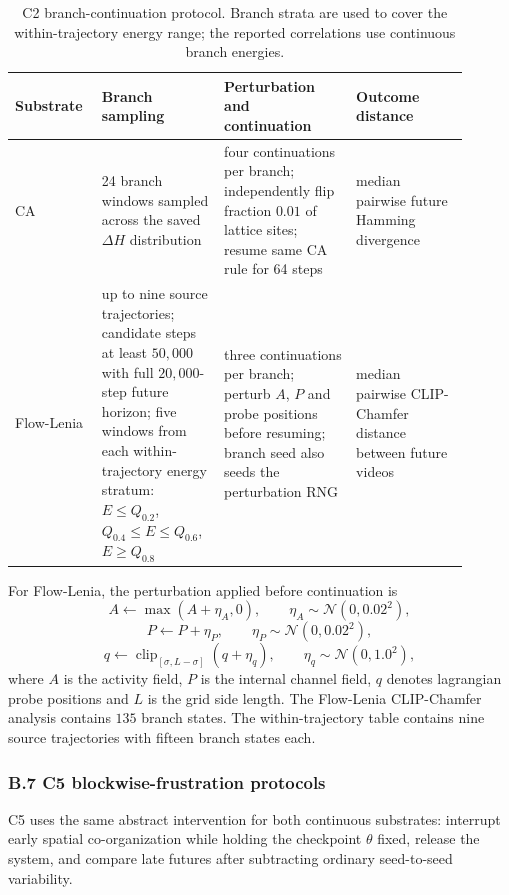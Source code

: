\begin{table}[H]
\centering
\scriptsize
\begin{tabular}{p{0.15\linewidth}p{0.25\linewidth}p{0.27\linewidth}p{0.23\linewidth}}
\toprule
Substrate & Branch sampling & Perturbation and continuation & Outcome distance \\
\midrule
CA & 24 branch windows sampled across the saved $\Delta H$ distribution & four continuations per branch; independently flip fraction $0.01$ of lattice sites; resume same CA rule for 64 steps & median pairwise future Hamming divergence \\
Flow-Lenia & up to nine source trajectories; candidate steps at least $50{,}000$ with full $20{,}000$-step future horizon; five windows from each within-trajectory energy stratum: $E\le Q_{0.2}$, $Q_{0.4}\le E\le Q_{0.6}$, $E\ge Q_{0.8}$ & three continuations per branch; perturb $A$, $P$ and probe positions before resuming; branch seed also seeds the perturbation RNG & median pairwise CLIP-Chamfer distance between future videos \\
\bottomrule
\end{tabular}
\caption{C2 branch-continuation protocol.  Branch strata are used to cover the within-trajectory energy range; the reported correlations use continuous branch energies.}
\label{tab:c2-protocols}
\end{table}
\FloatBarrier

For Flow-Lenia, the perturbation applied before continuation is
\[
  A\leftarrow\max(A+\eta_A,0),
  \qquad \eta_A\sim\mathcal N(0,0.02^2),
\]
\[
  P\leftarrow P+\eta_P,
  \qquad \eta_P\sim\mathcal N(0,0.02^2),
\]
\[
  q\leftarrow \operatorname{clip}_{[\sigma,L-\sigma]}(q+\eta_q),
  \qquad \eta_q\sim\mathcal N(0,1.0^2),
\]
where $A$ is the activity field, $P$ is the internal channel field, $q$ denotes lagrangian probe positions and $L$ is the grid side length.  The Flow-Lenia CLIP-Chamfer analysis contains $135$ branch states.  The within-trajectory table contains nine source trajectories with fifteen branch states each.

\subsubsection*{B.7 C5 blockwise-frustration protocols}

C5 uses the same abstract intervention for both continuous substrates: interrupt early spatial co-organization while holding the checkpoint $\theta$ fixed, release the system, and compare late futures after subtracting ordinary seed-to-seed variability.


